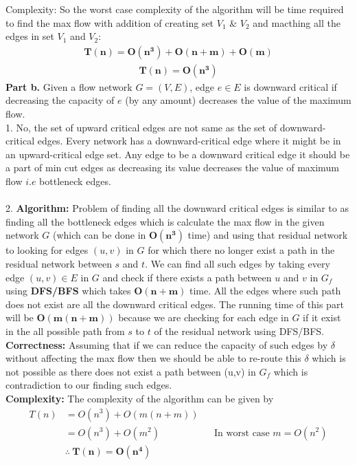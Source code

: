 \documentclass[a4paper,11pt]{article}
\theoremstyle{quest}
\newenvironment{solution}[2][Solution]{\begin{trivlist}
		\item[\hskip \labelsep {\bfseries #1}\hskip \labelsep {\bfseries #2.}]}{\end{trivlist}}
\begin{document}
\begin{solution}
	\textbf{Complexity: }So the worst case complexity of the algorithm will be time required to find the max flow with addition of creating set $V_1$ \& $V_2$ and macthing all the edges in set $V_1$ and $V_2$:
	\begin{align*}
	\mathbf{T(n) = O(n^3) + O(n+m) + O(m)}
	\end{align*}
	\begin{align*}
	\boxed{\mathbf{T(n) = O(n^3)}}
	\end{align*}
	\newpage
	\textbf{Part b.} Given a flow network $G = (V, E)$, edge $e \in E$ is downward critical if decreasing the capacity of $e$ (by any amount) decreases the value of the maximum flow.\\
	
	1. No, the set of upward critical edges are not same as the set of downward-critical edges. Every network has a downward-critical edge where it might be in an upward-critical edge set. Any edge to be a downward critical edge it should be a part of min cut edges as decreasing its value decreases the value of maximum flow $i.e$ bottleneck edges.\\\\
	2. \textbf{Algorithm: }Problem of finding all the downward critical edges is similar to as finding all the bottleneck edges which is calculate the max flow in the given network $G$ (which can be done in $\mathbf{O(n^3)}$ time) and using that residual network to looking for edges $(u,v)$ in $G$ for which there no longer exist a path in the residual network between $s$ and $t$. We can find all such edges by taking every edge $(u,v) \in E$ in $G$ and check if there exists a path between $u$ and $v$ in $G_f$ using \textbf{DFS/BFS} which takes $\mathbf{O(n+m)}$ time. All the edges where such path does not exist are all the downward critical edges. The running time of this part will be $\mathbf{O(m(n+m))}$ because we are checking for each edge in $G$ if it exist in the all possible path from $s$ to $t$ of the residual network using DFS/BFS.\\
	\textbf{Correctness: }Assuming that if we can reduce the capacity of such edges by $\delta$ without affecting the max flow then we should be able to re-route this $\delta$ which is not possible as there does not exist a path between (u,v) in $G_f$ which is contradiction to our finding such edges.\\
	\textbf{Complexity: }The complexity of the algorithm can be given by
	\begin{align*}
	T(n) &= O(n^3)+O(m(n+m))\\
	&= O(n^3) + O(m^2) && \text{In worst case $m = O(n^2)$}\\
	&\boxed{\therefore ~\mathbf{T(n) = O(n^4)}}
	\end{align*}
\end{solution}
\end{document}
